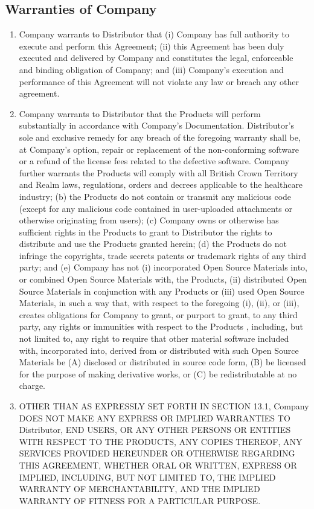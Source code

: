\documentclass[letterpaper,10pt,openany,oneside,english]{sphinxmanual}
\begin{document}
\subsection{Warranties of Company}
\label{\detokenize{warranties:warranties-of-company}}\begin{enumerate}
\item {} 
Company warrants to Distributor that (i) Company has full authority to execute and perform this Agreement; (ii) this Agreement has been duly executed and delivered by Company and constitutes the legal, enforceable and binding obligation of Company; and (iii) Company’s execution and performance of this Agreement will not violate any law or breach any other agreement.

\item {} 
Company warrants to Distributor that the Products will perform substantially in accordance with Company’s Documentation.  Distributor’s sole and exclusive remedy for any breach of the foregoing warranty shall be, at Company’s option, repair or replacement of the non-conforming software or a refund of the license fees related to the defective software.  Company further warrants  the Products will  comply with all British Crown Territory and Realm laws, regulations, orders and decrees applicable to the healthcare industry; (b)  the Products do not contain or transmit any malicious code (except for any malicious code contained in user-uploaded attachments or otherwise originating from users); (c) Company owns or otherwise has sufficient rights in the Products to grant to Distributor the rights to distribute and use the Products granted herein; (d) the Products do not infringe the copyrights, trade secrets patents or trademark rights of any third party; and (e) Company has not (i) incorporated Open Source Materials into, or combined Open Source Materials with, the Products, (ii) distributed Open Source Materials in conjunction with any Products or (iii) used Open Source Materials, in such a way that, with respect to the foregoing (i), (ii), or (iii), creates obligations for  Company to grant, or purport to grant, to any third party, any rights or immunities with respect to the Products , including, but not limited to, any right to require that other material software included with, incorporated into, derived from or distributed with such Open Source Materials be (A) disclosed or distributed in source code form, (B) be licensed for the purpose of making derivative works, or (C) be redistributable at no charge.

\item {} 
OTHER THAN AS EXPRESSLY SET FORTH IN SECTION 13.1, Company DOES NOT MAKE ANY EXPRESS OR IMPLIED WARRANTIES TO Distributor, END USERS, OR ANY OTHER PERSONS OR ENTITIES WITH RESPECT TO THE PRODUCTS, ANY COPIES THEREOF, ANY SERVICES PROVIDED HEREUNDER OR OTHERWISE REGARDING THIS AGREEMENT, WHETHER ORAL OR WRITTEN, EXPRESS OR IMPLIED, INCLUDING, BUT NOT LIMITED TO, THE IMPLIED WARRANTY OF MERCHANTABILITY, AND THE IMPLIED WARRANTY OF FITNESS FOR A PARTICULAR PURPOSE.

\end{enumerate}
\end{document}
